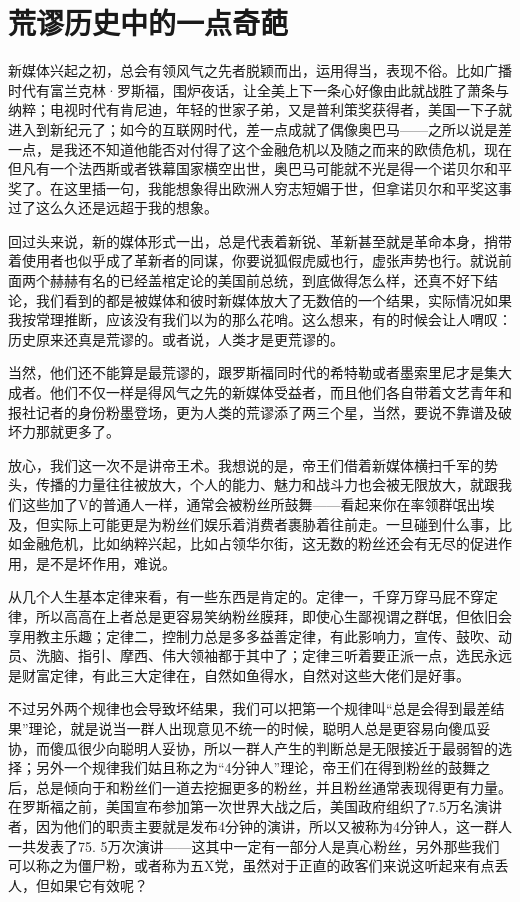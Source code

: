 \hypertarget{ux8352ux8c2cux5386ux53f2ux4e2dux7684ux4e00ux70b9ux5947ux8469}{%
\section{荒谬历史中的一点奇葩}\label{ux8352ux8c2cux5386ux53f2ux4e2dux7684ux4e00ux70b9ux5947ux8469}}

新媒体兴起之初，总会有领风气之先者脱颖而出，运用得当，表现不俗。比如广播时代有富兰克林·罗斯福，围炉夜话，让全美上下一条心好像由此就战胜了萧条与纳粹；电视时代有肯尼迪，年轻的世家子弟，又是普利策奖获得者，美国一下子就进入到新纪元了；如今的互联网时代，差一点成就了偶像奥巴马------之所以说是差一点，是我还不知道他能否对付得了这个金融危机以及随之而来的欧债危机，现在但凡有一个法西斯或者铁幕国家横空出世，奥巴马可能就不光是得一个诺贝尔和平奖了。在这里插一句，我能想象得出欧洲人穷志短媚于世，但拿诺贝尔和平奖这事过了这么久还是远超于我的想象。

回过头来说，新的媒体形式一出，总是代表着新锐、革新甚至就是革命本身，捎带着使用者也似乎成了革新者的同谋，你要说狐假虎威也行，虚张声势也行。就说前面两个赫赫有名的已经盖棺定论的美国前总统，到底做得怎么样，还真不好下结论，我们看到的都是被媒体和彼时新媒体放大了无数倍的一个结果，实际情况如果我按常理推断，应该没有我们以为的那么花哨。这么想来，有的时候会让人喟叹：历史原来还真是荒谬的。或者说，人类才是更荒谬的。

当然，他们还不能算是最荒谬的，跟罗斯福同时代的希特勒或者墨索里尼才是集大成者。他们不仅一样是得风气之先的新媒体受益者，而且他们各自带着文艺青年和报社记者的身份粉墨登场，更为人类的荒谬添了两三个星，当然，要说不靠谱及破坏力那就更多了。

放心，我们这一次不是讲帝王术。我想说的是，帝王们借着新媒体横扫千军的势头，传播的力量往往被放大，个人的能力、魅力和战斗力也会被无限放大，就跟我们这些加了V的普通人一样，通常会被粉丝所鼓舞------看起来你在率领群氓出埃及，但实际上可能更是为粉丝们娱乐着消费者裹胁着往前走。一旦碰到什么事，比如金融危机，比如纳粹兴起，比如占领华尔街，这无数的粉丝还会有无尽的促进作用，是不是坏作用，难说。

从几个人生基本定律来看，有一些东西是肯定的。定律一，千穿万穿马屁不穿定律，所以高高在上者总是更容易笑纳粉丝膜拜，即使心生鄙视谓之群氓，但依旧会享用教主乐趣；定律二，控制力总是多多益善定律，有此影响力，宣传、鼓吹、动员、洗脑、指引、摩西、伟大领袖都于其中了；定律三听着要正派一点，选民永远是财富定律，有此三大定律在，自然如鱼得水，自然对这些大佬们是好事。

不过另外两个规律也会导致坏结果，我们可以把第一个规律叫``总是会得到最差结果''理论，就是说当一群人出现意见不统一的时候，聪明人总是更容易向傻瓜妥协，而傻瓜很少向聪明人妥协，所以一群人产生的判断总是无限接近于最弱智的选择；另外一个规律我们姑且称之为``4分钟人''理论，帝王们在得到粉丝的鼓舞之后，总是倾向于和粉丝们一道去挖掘更多的粉丝，并且粉丝通常表现得更有力量。在罗斯福之前，美国宣布参加第一次世界大战之后，美国政府组织了7.5万名演讲者，因为他们的职责主要就是发布4分钟的演讲，所以又被称为4分钟人，这一群人一共发表了75.
5万次演讲------这其中一定有一部分人是真心粉丝，另外那些我们可以称之为僵尸粉，或者称为五X党，虽然对于正直的政客们来说这听起来有点丢人，但如果它有效呢？

